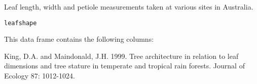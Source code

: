 \begin{Description}\relax
Leaf length, width and petiole measurements taken at various
sites in Australia.
\end{Description}
\begin{Usage}
\begin{verbatim}leafshape\end{verbatim}
\end{Usage}
\begin{Format}\relax
This data frame contains the following columns:
\end{Format}
\begin{Source}\relax
King, D.A. and Maindonald, J.H. 1999. Tree architecture in relation to
leaf dimensions and tree stature in temperate and tropical rain
forests. Journal of Ecology 87: 1012-1024.
\end{Source}

